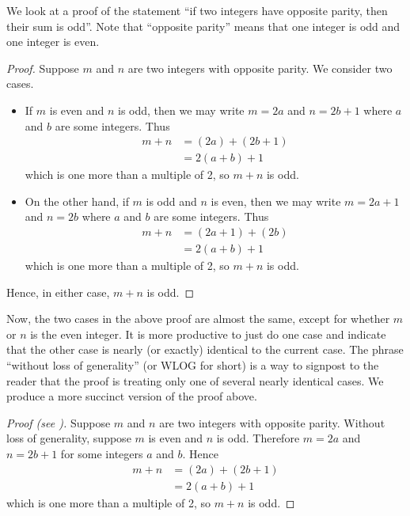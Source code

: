 \begin{example}
    We look at a proof of the statement ``if two integers have opposite parity, then their sum is odd''. Note that ``opposite parity'' means that one integer is odd and one integer is even.
    \begin{proof}
        Suppose $m$ and $n$ are two integers with opposite parity. We consider two cases.
        \begin{itemize}
            \item If $m$ is even and $n$ is odd, then we may write $m = 2a$ and $n = 2b + 1$ where $a$ and $b$ are some integers. Thus
            \begin{align*}
                m + n &= (2a) + (2b + 1)\\
                &= 2(a+b) + 1
            \end{align*}
            which is one more than a multiple of 2, so $m + n$ is odd.
            \item On the other hand, if $m$ is odd and $n$ is even, then we may write $m = 2a + 1$ and $n = 2b$ where $a$ and $b$ are some integers. Thus
            \begin{align*}
                m + n &= (2a + 1) + (2b)\\
                &= 2(a+b) + 1
            \end{align*}
            which is one more than a multiple of 2, so $m + n$ is odd.
        \end{itemize}
        Hence, in either case, $m + n$ is odd.
    \end{proof}

    Now, the two cases in the above proof are almost the same, except for whether $m$ or $n$ is the even integer. It is more productive to just do one case and indicate that the other case is nearly (or exactly) identical to the current case. The phrase ``without loss of generality'' (or WLOG for short) is a way to signpost to the reader that the proof is treating only one of several nearly identical cases. We produce a more succinct version of the proof above.

    \begin{proof}[Proof (see {\cite[p.~126]{hammack_2018}})]
        Suppose $m$ and $n$ are two integers with opposite parity. Without loss of generality, suppose $m$ is even and $n$ is odd. Therefore $m = 2a$ and $n = 2b + 1$ for some integers $a$ and $b$. Hence
        \begin{align*}
            m + n &= (2a) + (2b + 1)\\
            &= 2(a+b) + 1
        \end{align*}
        which is one more than a multiple of 2, so $m + n$ is odd.
    \end{proof}
\end{example}

